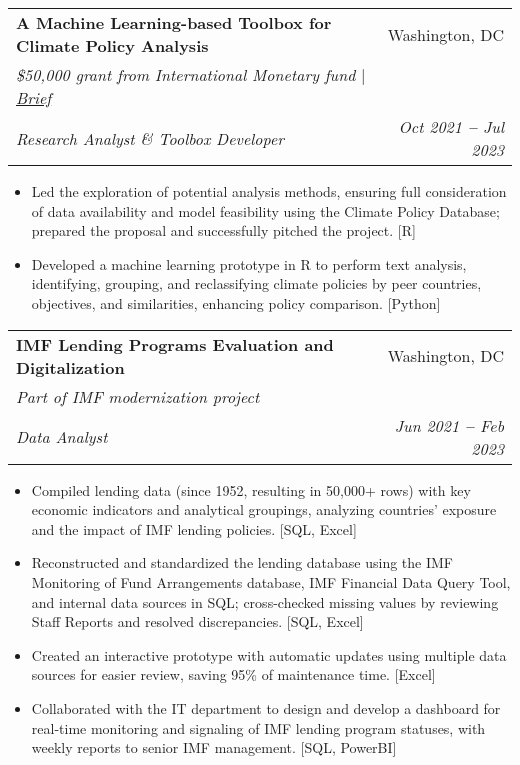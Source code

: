 \documentclass[letterpaper,11pt]{article}
\makeatletter
\newcommand{\resumeItem}[1]{
  \item\small{
    {#1 \vspace{-2pt}}
  }
}
\newcommand{\resumeItemListStart}{\begin{itemize}}
\newcommand{\resumeItemListEnd}{\end{itemize}\vspace{-5pt}}
\newcommand{\resumeProjectSubheading}[5]{
  \vspace{-1pt}\item
    \begin{tabular*}{0.97\textwidth}[t]{l@{\extracolsep{\fill}}r}
      \textbf{#1} & #2 \\
      \textit{\small#3} \\
      \textit{\small#4} & \textit{\small #5}\\
    \end{tabular*}\vspace{-7pt}
}
\makeatother
\begin{document}
    \resumeProjectSubheading
      {A Machine Learning-based Toolbox for Climate Policy Analysis} {Washington, DC}
      {\$50,000 grant from International Monetary fund $|$ {\href{https://imfilab.brightidea.com/D520}{\color{blue}Brief}}}
      {Research Analyst \& Toolbox Developer}{Oct 2021 \textbf{--} Jul 2023}
        \resumeItemListStart
            \resumeItem{Led the exploration of potential analysis methods, ensuring full consideration of data availability and model feasibility using the Climate Policy Database; prepared the proposal and successfully pitched the project. [R]}
            \resumeItem{Developed a machine learning prototype in R to perform text analysis, identifying, grouping, and reclassifying climate policies by peer countries, objectives, and similarities, enhancing policy comparison. [Python]}

        \resumeItemListEnd
        
    \resumeProjectSubheading
      {IMF Lending Programs Evaluation and Digitalization}{Washington, DC}
      {Part of IMF modernization project}
      {Data Analyst}{Jun 2021 \textbf{--} Feb 2023}
        \resumeItemListStart
            \resumeItem{Compiled lending data (since 1952, resulting in 50,000+ rows) with key economic indicators and analytical groupings, analyzing countries’ exposure and the impact of IMF lending policies. [SQL, Excel]}
            \resumeItem{Reconstructed and standardized the lending database using the IMF Monitoring of Fund Arrangements database, IMF Financial Data Query Tool, and internal data sources in SQL; cross-checked missing values by reviewing Staff Reports and resolved discrepancies. [SQL, Excel]}
            \resumeItem{Created an interactive prototype with automatic updates using multiple data sources for easier review, saving 95\% of maintenance time. [Excel]}
            \resumeItem{Collaborated with the IT department to design and develop a dashboard for real-time monitoring and signaling of IMF lending program statuses, with weekly reports to senior IMF management. [SQL, PowerBI]}
        \resumeItemListEnd 
    
\end{document}
